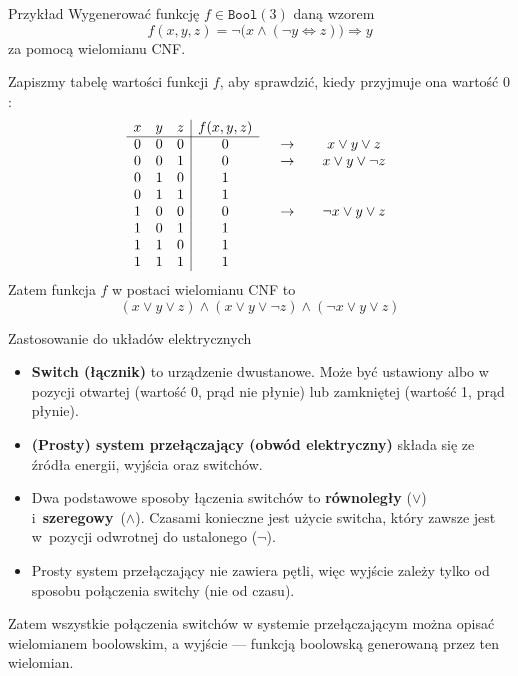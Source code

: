 \documentclass[a4paper,10pt]{beamer}
\begin{document}
\begin{frame}
		
		\begin{exampleblock}{Przykład}
			Wygenerować funkcję $f\in\mathtt{Bool}(3) $ daną wzorem $$f(x,y,z)=\neg\big(x\wedge(\neg y\Leftrightarrow z)\big)\Rightarrow y$$ za pomocą wielomianu CNF.
			
			Zapiszmy tabelę wartości funkcji $f$, aby sprawdzić, kiedy przyjmuje ona wartość $0$:
			$$\begin{array}{ccc|ccccc}
			x&y&z&f(x,y,z)\\\cline{1-4}
			0&0&0&0&&\to&& x\vee y\vee z\\
			0&0&1&0&&\to&& x\vee y\vee \neg z\\
			0&1&0&1&\\
			0&1&1&1&\\
			1&0&0&0&&\to&& \neg x\vee y\vee z\\
			1&0&1&1&\\
			1&1&0&1&\\
			1&1&1&1&
			\end{array}$$
			Zatem funkcja $f$ w postaci wielomianu CNF to
			$$(x\vee y\vee z)\wedge(x\vee y\vee \neg z)\wedge(\neg x\vee y\vee z)$$
		\end{exampleblock}
	
\end{frame}


\begin{frame}{Zastosowanie do układów elektrycznych}
	\begin{itemize}
		\item {\bf Switch (łącznik)} to urządzenie dwustanowe. Może być ustawiony albo w pozycji otwartej (wartość 0, prąd nie płynie) lub zamkniętej (wartość 1, prąd płynie).
		\item {\bf (Prosty) system przełączający (obwód elektryczny)} składa się ze źródła energii, wyjścia oraz switchów.
		\item Dwa podstawowe sposoby łączenia switchów to {\bf równoległy} ($\vee$) i~{\bf szeregowy}~($\wedge$). Czasami konieczne jest użycie switcha, który zawsze jest w~pozycji odwrotnej do ustalonego ($\neg$).
		\item Prosty system przełączający nie zawiera pętli, więc wyjście zależy tylko od sposobu połączenia switchy (nie od czasu).
	\end{itemize}
	Zatem wszystkie połączenia switchów w systemie przełączającym można opisać wielomianem boolowskim, a wyjście --- funkcją boolowską generowaną przez ten wielomian.
\end{frame}
\end{document}
